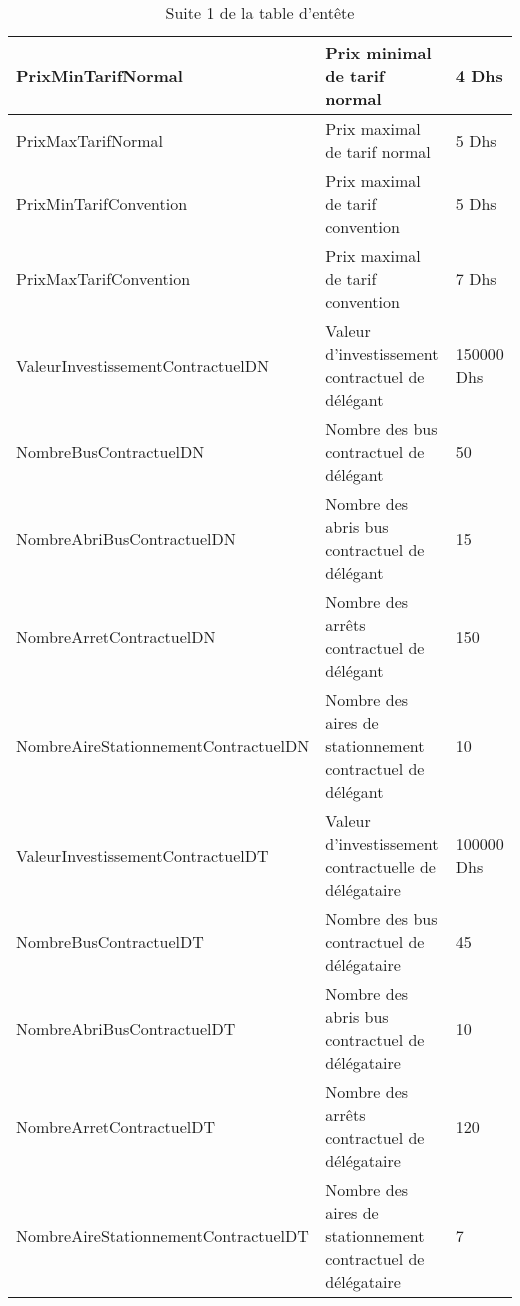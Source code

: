 \begin{table}[H]
\begin{center}
\begin{tabularx}{17.5cm}{|p{6.5cm}|X|p{2.1cm}|}
				\hline
				PrixMinTarifNormal                   & Prix minimal de tarif normal                                 & 4 Dhs            \\
				\hline
				PrixMaxTarifNormal                   & Prix maximal de tarif normal                                 & 5 Dhs            \\
				\hline
				PrixMinTarifConvention               & Prix maximal de tarif convention                             & 5 Dhs            \\
				\hline
				PrixMaxTarifConvention               & Prix maximal de tarif convention                             & 7 Dhs            \\
				\hline
				ValeurInvestissementContractuelDN    & Valeur d'investissement contractuel de délégant              & 150000 Dhs       \\
				\hline
				NombreBusContractuelDN               & Nombre des bus contractuel de délégant                       & 50               \\
				\hline
				NombreAbriBusContractuelDN           & Nombre des abris bus contractuel de délégant                 & 15               \\
				\hline
				NombreArretContractuelDN             & Nombre des arrêts contractuel de délégant                    & 150              \\
				\hline
				NombreAireStationnementContractuelDN & Nombre des aires de stationnement contractuel de délégant    & 10               \\
				\hline
				ValeurInvestissementContractuelDT    & Valeur d'investissement contractuelle de délégataire         & 100000 Dhs       \\
				\hline
				NombreBusContractuelDT               & Nombre des bus contractuel de délégataire                    & 45               \\
				\hline
				NombreAbriBusContractuelDT           & Nombre des abris bus contractuel de délégataire              & 10               \\
				\hline
				NombreArretContractuelDT             & Nombre des arrêts contractuel de délégataire                 & 120              \\
				\hline
				NombreAireStationnementContractuelDT & Nombre des aires de stationnement contractuel de délégataire & 7                \\
				\hline
			\end{tabularx}
			\caption{Suite 1 de la table d'entête}
		\end{center}
	\end{table}
